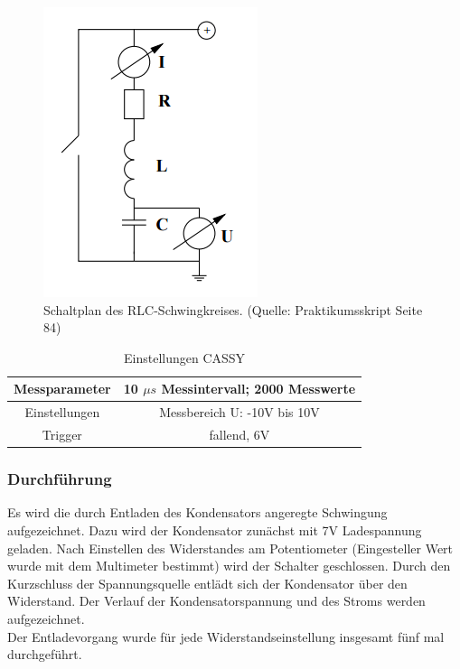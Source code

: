 \documentclass[12pt,a4paper]{article}
\begin{document}
\begin{figure}
\begin{center}
\includegraphics[scale=0.8]{Bilder/RLCSchaltung.png}
\end{center}
\caption[RLC Schaltung]{Schaltplan des RLC-Schwingkreises. (Quelle: Praktikumsskript Seite 84)}
\label{fig:RLCSchaltung}
\end{figure}

\begin{table}
\begin{center}
\begin{tabular}{|c|c|}
\hline
Messparameter &  10 $\mu s$ Messintervall;  2000 Messwerte \\
\hline
Einstellungen & Messbereich U: -10V bis 10V\\
\hline
Trigger & fallend, 6V\\
\hline
\end{tabular}
\caption[CASSY]{Einstellungen CASSY}
\label{tab:CASSY}
\end{center}
\end{table}


\subsubsection{Durchführung}
Es wird die durch Entladen des Kondensators angeregte Schwingung aufgezeichnet. Dazu wird der Kondensator zunächst mit 7V Ladespannung geladen. Nach Einstellen des Widerstandes am Potentiometer (Eingesteller Wert wurde mit dem Multimeter bestimmt) wird der Schalter geschlossen. Durch den Kurzschluss der Spannungsquelle entlädt sich der Kondensator über den Widerstand. Der Verlauf der Kondensatorspannung und des Stroms werden aufgezeichnet.\\
Der Entladevorgang wurde für jede Widerstandseinstellung insgesamt fünf mal durchgeführt.
\end{document}
